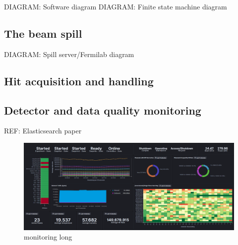 DIAGRAM: Software diagram
DIAGRAM: Finite state machine diagram

\subsection{The beam spill} %
\label{sec:daq_soft_spill} %

DIAGRAM: Spill server/Fermilab diagram

\subsection{Hit acquisition and handling} %
\label{sec:daq_soft_hits} %

\subsection{Detector and data quality monitoring} %
\label{sec:daq_soft_monitor} %

REF: Elasticsearch paper

\begin{figure} %
    \includegraphics[width=\textwidth]{diagrams/5-daq/monitoring.png}
    \caption[monitoring short]
    {monitoring long}
    \label{fig:monitoring}
\end{figure}